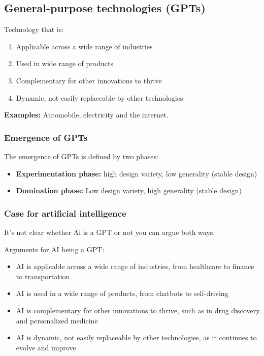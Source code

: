 \documentclass[12pt,a4paper]{article}
\begin{document}
\subsection{General-purpose technologies (GPTs)}
Technology that is:
\begin{enumerate}
    \item Applicable across a wide range of industries
    \item Used in wide range of products
    \item Complementary for other innovations to thrive
    \item Dynamic, not easily replaceable by other technologies
\end{enumerate}

\textbf{Examples:} Automobile, electricity and the internet.

\subsubsection{Emergence of GPTs}
The emergence of GPTs is defined by two phases:
\begin{itemize}
    \item \textbf{Experimentation phase:} high design variety, low generality (stable design)
    \item \textbf{Domination phase:} Low design variety, high generality (stable design)
\end{itemize}

\subsubsection{Case for artificial intelligence}
It's not clear whether Ai is a GPT or not you can argue both ways.

\vspace{10pt}
Arguments for AI being a GPT:
\begin{itemize}
    \item AI is applicable across a wide range of industries, from healthcare to finance to transportation
    \item AI is used in a wide range of products, from chatbots to self-driving
    \item AI is complementary for other innovations to thrive, such as in drug discovery and personalized medicine
    \item AI is dynamic, not easily replaceable by other technologies, as it continues to evolve and improve
\end{itemize}
\end{document}
